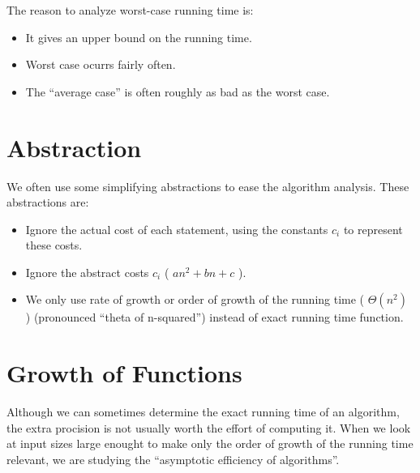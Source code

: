 The reason to analyze worst-case running time is:
\begin{itemize}
\item It gives an upper bound on the running time.
\item Worst case ocurrs fairly often.
\item The ``average case'' is often roughly as bad as the worst case.
\end{itemize}

\section{Abstraction}
\label{sec:abstraction}


We often use some simplifying abstractions to ease the algorithm analysis.
These abstractions are:
\begin{itemize}
\item Ignore the actual cost of each statement, using the constants $c_i$ to represent these costs.
\item Ignore the abstract costs $c_i$ ( $an^2 + bn + c$ ).
\item We only use rate of growth or order of growth of the running time ( $\Theta(n^2)$ ) (pronounced ``theta of n-squared'') instead of exact running time function. 

\end{itemize}


\section{Growth of Functions}
\label{sec:growth-functions}


Although we can sometimes determine the exact running time of an algorithm, the extra procision is not usually worth the effort of computing it.
When we look at input sizes large enought to make only the order of growth of the running time relevant, we are studying the ``asymptotic efficiency of algorithms''.





